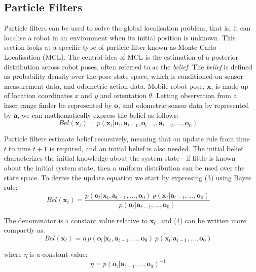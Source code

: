 \documentclass[a4paper]{article}
\begin{document}
\subsection{Particle Filters}
Particle filters can be used to solve the global localisation problem, that is, it can localise a robot in an environment when its initial position is unknown. This section looks at a specific type of particle filter known as Monte Carlo Localisation (MCL). The central idea of MCL is the estimation of a posterior distribution across robot poses, often referred to as the \textit{belief}. The \textit{belief} is defined as probability density over the pose state space, which is conditioned on sensor measurement data, and odometric action data. Mobile robot pose, $\mathbf{x}$, is made up of location coordinates $x$ and $y$ and orientation $\theta$. Letting observation from a laser range finder be represented by $\mathbf{o}$, and odometric sensor data by represented by $\mathbf{a}$, we can mathematically express the belief as follows:
\begin{equation}
Bel(\mathbf{x}_t) = p(\mathbf{x}_t | \mathbf{o}_t, \mathbf{a}_{t-1}, \mathbf{o}_{t-1}, \mathbf{a}_{t-2},\ldots,\mathbf{o}_0)
\end{equation}

Particle filters estimate belief recursively, meaning that an update rule from time $t$ to time $t+1$ is required, and an initial belief is also needed. The initial belief characterizes the initial knowledge about the system state - if little is known about the initial system state, then a uniform distribution can be used over the state space. To derive the update equation we start by expressing (3) using Bayes rule:
\begin{equation}
Bel(\mathbf{x}_t) = \frac{p(\mathbf{o}_t | \mathbf{x}_t,\mathbf{a}_{t-1},\ldots,\mathbf{o}_0) \ p(\mathbf{x}_t | \mathbf{a}_{t-1},\ldots,\mathbf{o}_0)}{p(\mathbf{o}_t | \mathbf{a}_{t-1},\ldots,\mathbf{o}_0)}
\end{equation}

The denominator is a constant value relative to $\mathbf{x}_t$, and (4) can be written more compactly as:
\begin{equation}
Bel(\mathbf{x}_t) = \eta \ p(\mathbf{o}_t | \mathbf{x}_t,\mathbf{a}_{t-1},\ldots,\mathbf{o}_0) \ p(\mathbf{x}_t | \mathbf{a}_{t-1},\ldots,\mathbf{o}_0)
\end{equation}

where $\eta$ is a constant value:
\begin{equation}
\eta = p(\mathbf{o}_t | \mathbf{a}_{t-1},\ldots,\mathbf{o}_0)^{-1}
\end{equation}
\end{document}

